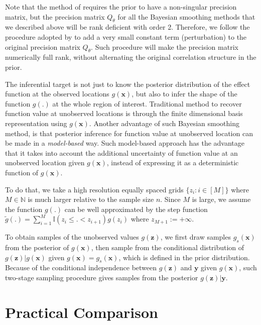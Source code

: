 \documentclass{article}
\begin{document}
Note that the method of \cite{tierney1986accurate} requires the prior to have a non-singular precision matrix, but the precision matrix $Q_\theta$ for all the Bayesian smoothing methods that we described above will be rank deficient with order 2. Therefore, we follow the procedure adopted by \cite{wood2011fast} to add a very small constant term (perturbation) to the original precision matrix $Q_\theta$. Such procedure will make the precision matrix numerically full rank, without alternating the original correlation structure in the prior.

The inferential target is not just to know the posterior distribution of the effect function at the observed locations $g(\boldsymbol{x})$, but also to infer the shape of the function $g(.)$ at the whole region of interest. Traditional method to recover function value at unobserved locations is through the finite dimensional basis representation using $g(\boldsymbol{x})$. Another advantage of such Bayesian smoothing method, is that posterior inference for function value at unobserved location can be made in a \textit{model-based} way. Such model-based approach has the advantage that it takes into account the additional uncertainty of function value at an unobserved location given $g(\boldsymbol{x})$, instead of expressing it as a deterministic function of $g(\boldsymbol{x})$.

To do that, we take a high resolution equally spaced grids $\{z_i:i\in[M]\}$ where $M \in \mathbb{N}$ is much larger relative to the sample size $n$. Since $M$ is large, we assume the function $g(.)$ can be well approximated by the step function $\tilde{g}(.) = \sum_{i=1}^{M} \mathbb{I}(z_{i}\leq.< z_{i+1})g(z_i)$ where $z_{M+1} := +\infty$.

To obtain samples of the unobserved values $g(\boldsymbol{z})$, we first draw samples $g_s(\boldsymbol{x})$ from the posterior of $g(\boldsymbol{x})$, then sample from the conditional distribution of $g(\boldsymbol{z})|g(\boldsymbol{x})$ given $g(\boldsymbol{x}) = g_s(\boldsymbol{x})$, which is defined in the prior distribution. Because of the conditional independence between $g(\boldsymbol{z})$ and $\boldsymbol{y}$ given $g(\boldsymbol{x})$, such two-stage sampling procedure gives samples from the posterior 
$g(\boldsymbol{z})|\boldsymbol{y}$.

\section{Practical Comparison}\label{practice}
\end{document}
